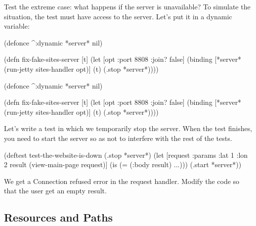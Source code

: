 Test the extreme case: what happens if the server is unavailable? To simulate the situation, the test must have access to the server. Let's put it in a dynamic variable:


\ifx\DEVICETYPE\MOBILE

\begin{english}
  \begin{clojure}
(defonce ^:dynamic *server* nil)

(defn fix-fake-sites-server [t]
  (let [opt {:port 8808 :join? false}]
    (binding [*server*
              (run-jetty
                sites-handler opt)]
      (t)
      (.stop *server*))))
  \end{clojure}
\end{english}

\else

\begin{english}
  \begin{clojure}
(defonce ^:dynamic *server* nil)

(defn fix-fake-sites-server [t]
  (let [opt {:port 8808 :join? false}]
    (binding [*server*
              (run-jetty sites-handler opt)]
      (t)
      (.stop *server*))))
  \end{clojure}
\end{english}

\fi

Let's write a test in which we temporarily stop the server. When the test finishes, you need to start the server so as not to interfere with the rest of the tests.

\begin{english}
  \begin{clojure}
(deftest test-the-website-is-down
  (.stop *server*)
  (let [request {:params {:lat 1 :lon 2}}
        result (view-main-page request)]
    (is (= (:body result) {...})))
  (.start *server*))
  \end{clojure}
\end{english}

We get a Connection refused error in the request handler. Modify the code so that the user get an empty result.

\subsection{Resources and Paths}

\label{resources}


